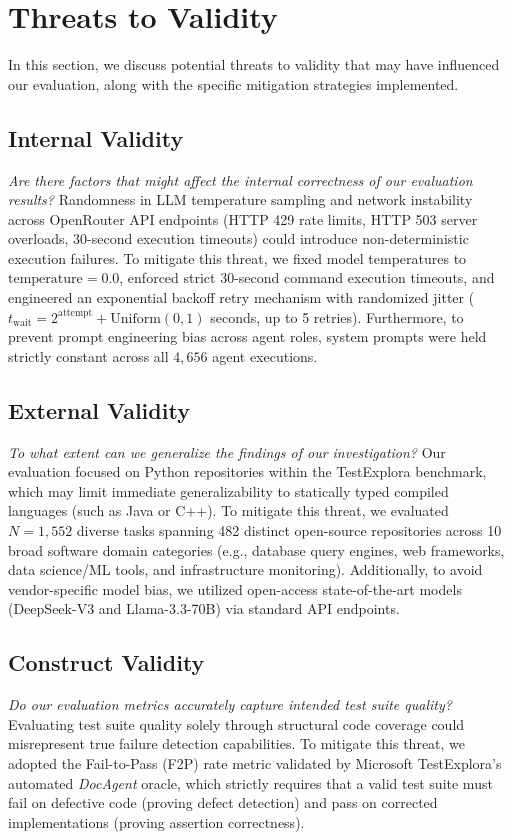 \section{Threats to Validity}
\label{sec:threats}

In this section, we discuss potential threats to validity that may have influenced our evaluation, along with the specific mitigation strategies implemented.

\subsection{Internal Validity}
\textit{Are there factors that might affect the internal correctness of our evaluation results?}
Randomness in LLM temperature sampling and network instability across OpenRouter API endpoints (HTTP 429 rate limits, HTTP 503 server overloads, 30-second execution timeouts) could introduce non-deterministic execution failures. To mitigate this threat, we fixed model temperatures to $\text{temperature}=0.0$, enforced strict 30-second command execution timeouts, and engineered an exponential backoff retry mechanism with randomized jitter ($t_{\text{wait}} = 2^{\text{attempt}} + \text{Uniform}(0, 1)$ seconds, up to 5 retries). Furthermore, to prevent prompt engineering bias across agent roles, system prompts were held strictly constant across all $4,656$ agent executions.

\subsection{External Validity}
\textit{To what extent can we generalize the findings of our investigation?}
Our evaluation focused on Python repositories within the TestExplora benchmark, which may limit immediate generalizability to statically typed compiled languages (such as Java or C++). To mitigate this threat, we evaluated $N=1,552$ diverse tasks spanning 482 distinct open-source repositories across 10 broad software domain categories (e.g., database query engines, web frameworks, data science/ML tools, and infrastructure monitoring). Additionally, to avoid vendor-specific model bias, we utilized open-access state-of-the-art models (DeepSeek-V3 and Llama-3.3-70B) via standard API endpoints.

\subsection{Construct Validity}
\textit{Do our evaluation metrics accurately capture intended test suite quality?}
Evaluating test suite quality solely through structural code coverage could misrepresent true failure detection capabilities. To mitigate this threat, we adopted the Fail-to-Pass (F2P) rate metric validated by Microsoft TestExplora's automated \textit{DocAgent} oracle, which strictly requires that a valid test suite must fail on defective code (proving defect detection) and pass on corrected implementations (proving assertion correctness).

